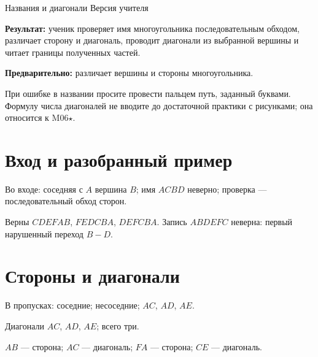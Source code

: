 \worksheettitle
  {Названия и диагонали}
  { Версия учителя}

\begin{teacherbox}
  \textbf{Результат:} ученик проверяет имя многоугольника последовательным
  обходом, различает сторону и диагональ, проводит диагонали из выбранной
  вершины и читает границы полученных частей.

  \textbf{Предварительно:} различает вершины и стороны многоугольника.
\end{teacherbox}

\begin{teacherbox}
  При ошибке в названии просите провести пальцем путь, заданный буквами.
  Формулу числа диагоналей не вводите до достаточной практики с рисунками;
  она относится к M06\(\star\).
\end{teacherbox}

\section{Вход и разобранный пример}

Во входе: соседняя с $A$ вершина $B$; имя $ACBD$ неверно; проверка ---
последовательный обход сторон.

\correctnamingfigure

\begin{practicebox}
  Верны $CDEFAB$, $FEDCBA$, $DEFCBA$. Запись $ABDEFC$ неверна:
  первый нарушенный переход $B-D$.
\end{practicebox}

\section{Стороны и диагонали}

\diagonalfigure

В пропусках: соседние; несоседние; $AC$, $AD$, $AE$.

\begin{practicebox}[2. Диагонали из $A$]
  \hexagondiagonalsanswer
  Диагонали $AC$, $AD$, $AE$; всего три.
\end{practicebox}

\begin{practicebox}[3. Классификация]
  $AB$ --- сторона; $AC$ --- диагональ; $FA$ --- сторона;
  $CE$ --- диагональ.
\end{practicebox}

\pentagonsplitfigure

